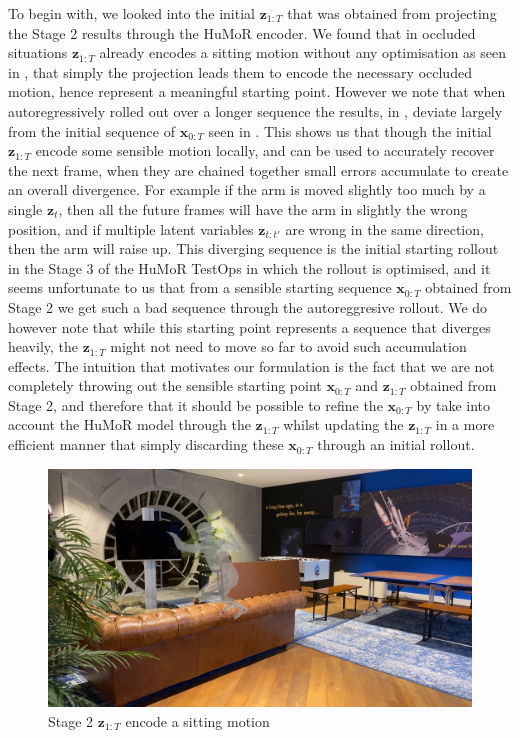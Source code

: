 To begin with, we looked into the initial $\mathbf{z}_{1:T}$ that was obtained from projecting the Stage 2 results through the HuMoR encoder. We found that in occluded situations $\mathbf{z}_{1:T}$ already encodes a sitting motion without any optimisation as seen in , that simply the projection leads them to encode the necessary occluded motion, hence represent a meaningful starting point. However we note that when autoregressively rolled out over a longer sequence the results, in , deviate largely from the initial sequence of $\mathbf{x}_{0:T}$ seen in . This shows us that though the initial $\mathbf{z}_{1:T}$ encode some sensible motion locally, and can be used to accurately recover the next frame, when they are chained together small errors accumulate to create an overall divergence. For example if the arm is moved slightly too much by a single $\mathbf{z}_t$, then all the future frames will have the arm in slightly the wrong position, and if multiple latent variables $\mathbf{z}_{t:t'}$ are wrong in the same direction, then the arm will raise up. This diverging sequence is the initial starting rollout in the Stage 3 of the HuMoR TestOps in which the rollout is optimised, and it seems unfortunate to us that from a sensible starting sequence $\mathbf{x}_{0:T}$ obtained from Stage 2 we get such a bad sequence through the autoreggresive rollout. We do however note that while this starting point represents a sequence that diverges heavily, the $\mathbf{z}_{1:T}$ might not need to move so far to avoid such accumulation effects. The intuition that motivates our formulation is the fact that we are not completely throwing out the sensible starting point $\mathbf{x}_{0:T}$ and $\mathbf{z}_{1:T}$ obtained from Stage 2, and therefore that it should be possible to refine the $\mathbf{x}_{0:T}$ by take into account the HuMoR model through the $\mathbf{z}_{1:T}$ whilst updating the $\mathbf{z}_{1:T}$ in a more efficient manner that simply discarding these $\mathbf{x}_{0:T}$ through an initial rollout.

\begin{figure}
    \centering
    \includegraphics[width=1\textwidth]{Figures/humor/improvement/Rollout_stage_2/sitting_clip/rollout_sitting_example/frame_00000078.jpg}
    \caption{Stage 2 $\mathbf{z}_{1:T}$ encode a sitting motion}
    \label{fig:humor_stage_2_rollout_sitting}
\end{figure}


